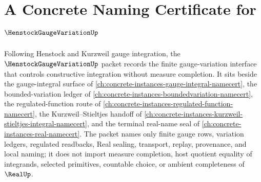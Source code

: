 \chapter{A Concrete Naming Certificate for $\HenstockGaugeVariationUp$}
\label{ch:concrete-instances-henstock-gauge-variation-namecert}

Following Henstock and Kurzweil gauge integration, the $\HenstockGaugeVariationUp$ packet records the finite gauge-variation interface that controls constructive integration without measure completion. It sits beside the gauge-integral surface of \autoref{ch:concrete-instances-gauge-integral-namecert}, the bounded-variation ledger of \autoref{ch:concrete-instances-boundedvariation-namecert}, the regulated-function route of \autoref{ch:concrete-instances-regulated-function-namecert}, the Kurzweil--Stieltjes handoff of \autoref{ch:concrete-instances-kurzweil-stieltjes-integral-namecert}, and the terminal real-name seal of \autoref{ch:concrete-instances-real-namecert}. The packet names only finite gauge rows, variation ledgers, regulated readbacks, Real sealing, transport, replay, provenance, and local naming; it does not import measure completion, host quotient equality of integrands, selected primitives, countable choice, or ambient completeness of $\RealUp$.

